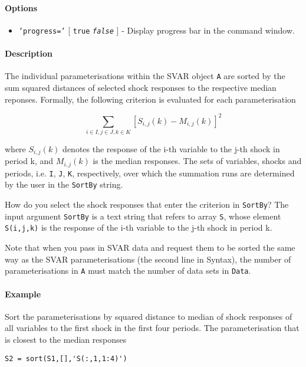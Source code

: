 \paragraph{Options}\label{options}

\begin{itemize}
\itemsep1pt\parskip0pt
\item
  \texttt{'progress='} {[} \texttt{true} \textbar{}
  \emph{\texttt{false}} {]} - Display progress bar in the command
  window.
\end{itemize}

\paragraph{Description}\label{description}

The individual parameterisations within the SVAR object \texttt{A} are
sorted by the sum squared distances of selected shock responses to the
respective median reponses. Formally, the following criterion is
evaluated for each parameterisation

\[ \sum_{i\in I,j\in J,k\in K} \left[ S_{i,j}(k) - M_{i,j}(k) \right]^2 \]

where $S_{i,j}(k)$ denotes the response of the i-th variable to the j-th
shock in period k, and $M_{i,j}(k)$ is the median responses. The sets of
variables, shocks and periods, i.e. \texttt{I}, \texttt{J}, \texttt{K},
respectively, over which the summation runs are determined by the user
in the \texttt{SortBy} string.

How do you select the shock responses that enter the criterion in
\texttt{SortBy}? The input argument \texttt{SortBy} is a text string
that refers to array \texttt{S}, whose element \texttt{S(i,j,k)} is the
response of the i-th variable to the j-th shock in period k.

Note that when you pass in SVAR data and request them to be sorted the
same way as the SVAR parameterisations (the second line in Syntax), the
number of parameterisations in \texttt{A} must match the number of data
sets in \texttt{Data}.

\paragraph{Example}\label{example}

Sort the parameterisations by squared distance to median of shock
responses of all variables to the first shock in the first four periods.
The parameterisation that is closest to the median responses

\begin{verbatim}
S2 = sort(S1,[],'S(:,1,1:4)')
\end{verbatim}



